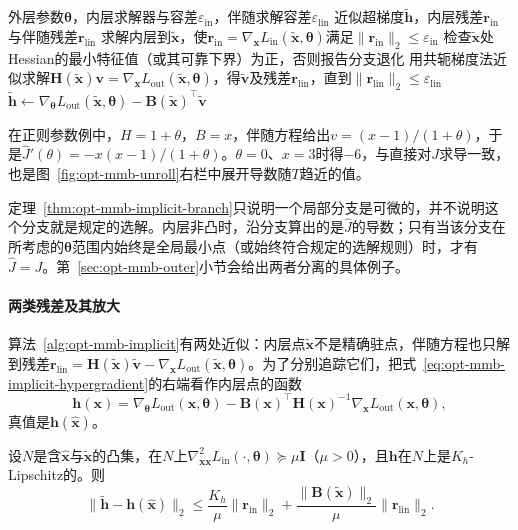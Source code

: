 \begin{algorithm}[隐式超梯度]
\label{alg:opt-mmb-implicit}
\begin{algorithmic}[1]
\Require 外层参数$\bm\theta$，内层求解器与容差$\varepsilon_{\mathrm{in}}$，伴随求解容差$\varepsilon_{\mathrm{lin}}$
\Ensure 近似超梯度$\tilde{\bm h}$，内层残差$\bm r_{\mathrm{in}}$与伴随残差$\bm r_{\mathrm{lin}}$
\State 求解内层到$\tilde{\bm x}$，使$\bm r_{\mathrm{in}}=\nabla_{\bm x}L_{\mathrm{in}}(\tilde{\bm x},\bm\theta)$满足$\lVert\bm r_{\mathrm{in}}\rVert_2\leq\varepsilon_{\mathrm{in}}$
\State 检查$\tilde{\bm x}$处Hessian的最小特征值（或其可靠下界）为正，否则报告分支退化
\State 用共轭梯度法近似求解$\bm H(\tilde{\bm x})\bm v=\nabla_{\bm x}L_{\mathrm{out}}(\tilde{\bm x},\bm\theta)$，得$\tilde{\bm v}$及残差$\bm r_{\mathrm{lin}}$，直到$\lVert\bm r_{\mathrm{lin}}\rVert_2\leq\varepsilon_{\mathrm{lin}}$
\State $\tilde{\bm h}\gets\nabla_{\bm\theta}L_{\mathrm{out}}(\tilde{\bm x},\bm\theta)-\bm B(\tilde{\bm x})^\top\tilde{\bm v}$
\end{algorithmic}
\end{algorithm}

在正则参数例中，$H=1+\theta$，$B=x$，伴随方程给出$v=(x-1)/(1+\theta)$，于是$\widehat J'(\theta)=-x(x-1)/(1+\theta)$。$\theta=0$、$x=3$时得$-6$，与直接对$J$求导一致，也是图~\ref{fig:opt-mmb-unroll}右栏中展开导数随$T$趋近的值。

定理~\ref{thm:opt-mmb-implicit-branch}只说明一个局部分支是可微的，并不说明这个分支就是规定的选解。内层非凸时，沿分支算出的是$\widehat J$的导数；只有当该分支在所考虑的$\bm\theta$范围内始终是全局最小点（或始终符合规定的选解规则）时，才有$\widehat J=J$。第~\ref{sec:opt-mmb-outer}小节会给出两者分离的具体例子。

\paragraph{两类残差及其放大}
算法~\ref{alg:opt-mmb-implicit}有两处近似：内层点$\tilde{\bm x}$不是精确驻点，伴随方程也只解到残差$\bm r_{\mathrm{lin}}=\bm H(\tilde{\bm x})\tilde{\bm v}-\nabla_{\bm x}L_{\mathrm{out}}(\tilde{\bm x},\bm\theta)$。为了分别追踪它们，把式~\eqref{eq:opt-mmb-implicit-hypergradient}的右端看作内层点的函数
\[
\bm h(\bm x)=\nabla_{\bm\theta}L_{\mathrm{out}}(\bm x,\bm\theta)-\bm B(\bm x)^\top\bm H(\bm x)^{-1}\nabla_{\bm x}L_{\mathrm{out}}(\bm x,\bm\theta),
\]
真值是$\bm h(\hat{\bm x})$。

\begin{lemma}[超梯度的误差分解]
\label{lem:opt-mmb-hypergradient-error}
设$N$是含$\hat{\bm x}$与$\tilde{\bm x}$的凸集，在$N$上$\nabla^2_{\bm x\bm x}L_{\mathrm{in}}(\cdot,\bm\theta)\succeq\mu\bm I$（$\mu>0$），且$\bm h$在$N$上是$K_h$-Lipschitz的。则
\[
\lVert\tilde{\bm h}-\bm h(\hat{\bm x})\rVert_2\leq\frac{K_h}{\mu}\lVert\bm r_{\mathrm{in}}\rVert_2+\frac{\lVert\bm B(\tilde{\bm x})\rVert_2}{\mu}\lVert\bm r_{\mathrm{lin}}\rVert_2.
\]
\end{lemma}

